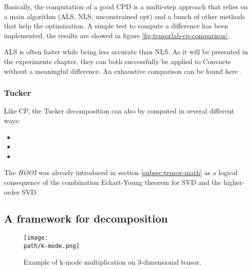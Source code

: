 Basically, the computation of a good CPD is a multi-step approach that relies on a main algorithm (ALS, NLS, unconstrained opt) and a bunch of other methods that help the optimization. 
A simple test to compute a difference has been implemented, the results are showed in figure \ref{fig:tensorlab-cp-comparison}.
\newline 

ALS is often faster while being less accurate than NLS. As it will be presented in the experiments chapter, they can both successfully be applied to Convnets without a meaningful difference. 
An exhaustive comparison can be found here \parencite{WCPD-talk}. 

\subsubsection{Tucker}
Like CP, the Tucker decomposition can also by computed in several different ways: 
\begin{itemize}
    \item 
    
    \item 
    
    \item 
\end{itemize}

The \emph{HOOI} was already introduced in section \ref{subsec:tensor-math} as a logical consequence of the combination Eckart-Young theorem for SVD and the higher-order SVD. 
\subsection{A framework for decomposition}
\label{subsec:framework}












\begin{figure}[h!]
 \centering
 \texttt{[image: \\path/k-mode.png]} 
  \caption{Example of k-mode multiplication on 3-dimensional tensor.}
 \label{fig:k-mode}
\end{figure}

\bigskip


